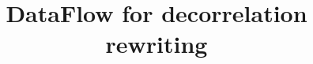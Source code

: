 \documentclass{article}
\begin{document}
\title{DataFlow for decorrelation rewriting}
\end{document}
